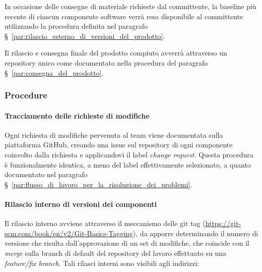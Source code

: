 \documentclass[../../norme-di-progetto.tex]{subfiles}
\begin{document}
In occasione delle consegne di materiale richieste dal committente, la baseline più recente di ciascun componente software verrà resa disponibile al committente utilizzando la procedura definita nel paragrafo §~\ref{par:rilascio_esterno_di_versioni_del_prodotto}.

Il rilascio e consegna finale del prodotto compiuto avverrà attraverso un repository unico come documentato nella procedura del paragrafo §~\ref{par:consegna_del_prodotto}.



\subsubsection{Procedure}%
\label{subs:gestione_della_configurazione/procedure}

\paragraph{Tracciamento delle richieste di modifiche}%
\label{par:tracciamento_delle_richieste_di_modifiche}

Ogni richiesta di modifiche pervenuta al team viene documentata sulla piattaforma GitHub, creando una issue sul repository di ogni componente coinvolto dalla richiesta e applicandovi il label \textit{change request}.
Questa procedura è funzionalmente identica, a meno del label effettivamente selezionato, a quanto documentato nel paragrafo §~\ref{par:flusso_di_lavoro_per_la_risoluzione_dei_problemi}.


\paragraph{Rilascio interno di versioni dei componenti}%
\label{par:rilascio_interno_di_versioni_dei_componenti}

Il rilascio interno avviene attraverso il meccanismo delle git tag (\href{https://git-scm.com/book/en/v2/Git-Basics-Tagging}{https://git-scm.com/book/en/v2/Git-Basics-Tagging}), da apporre determinando il numero di versione che risulta dall'approvazione di un set di modifiche, che coincide con il \textit{merge} sulla branch di default del repository del lavoro effettuato su una \textit{feature/fix branch}. Tali rilasci interni sono visibili agli indirizzi:
\end{document}
